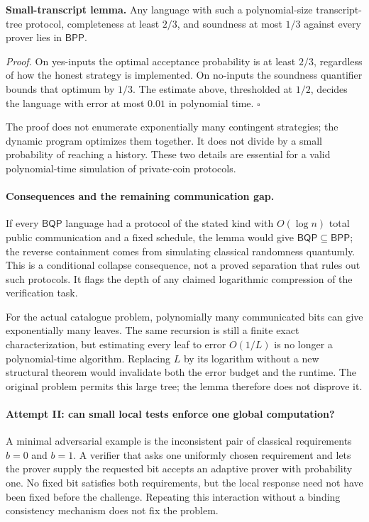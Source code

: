 \documentclass[11pt,a4paper]{article}
\numberwithin{equation}{section}
\begin{document}
\textbf{Small-transcript lemma.}
Any language with such a polynomial-size transcript-tree protocol,
completeness at least $2/3$, and soundness at most $1/3$ against every
prover lies in $\mathsf{BPP}$.

\emph{Proof.} On yes-inputs the optimal acceptance probability is at
least $2/3$, regardless of how the honest strategy is implemented.
On no-inputs the soundness quantifier bounds that optimum by $1/3$.
The estimate above, thresholded at $1/2$, decides the language with
error at most $0.01$ in polynomial time. \hfill$\square$

The proof does not enumerate exponentially many contingent strategies;
the dynamic program optimizes them together.  It does not divide by a
small probability of reaching a history.  These two details are
essential for a valid polynomial-time simulation of private-coin
protocols.

\paragraph{Consequences and the remaining communication gap.}
If every $\mathsf{BQP}$ language had a protocol of the stated kind with
$O(\log n)$ total public communication and a fixed schedule, the lemma
would give $\mathsf{BQP}\subseteq\mathsf{BPP}$; the reverse containment
comes from simulating classical randomness quantumly.  This is a
conditional collapse consequence, not a proved separation that rules
out such protocols.  It flags the depth of any claimed logarithmic
compression of the verification task.

For the actual catalogue problem, polynomially many communicated bits
can give exponentially many leaves.  The same recursion is still a
finite exact characterization, but estimating every leaf to error
$O(1/L)$ is no longer a polynomial-time algorithm.  Replacing $L$ by
its logarithm without a new structural theorem would invalidate both
the error budget and the runtime.  The original problem permits this
large tree; the lemma therefore does not disprove it.

\paragraph{Attempt II: can small local tests enforce one global computation?}
A minimal adversarial example is the inconsistent pair of classical
requirements $b=0$ and $b=1$.  A verifier that asks one uniformly chosen
requirement and lets the prover supply the requested bit accepts an
adaptive prover with probability one.  No fixed bit satisfies both
requirements, but the local response need not have been fixed before
the challenge.  Repeating this interaction without a binding
consistency mechanism does not fix the problem.
\end{document}
